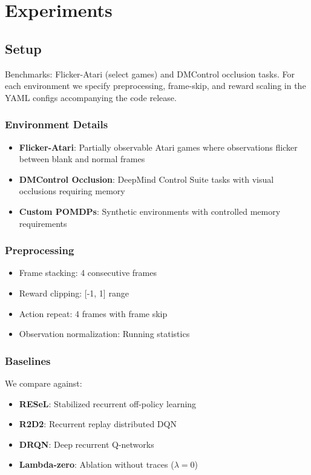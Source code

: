 \documentclass{article}
\begin{document}
\section{Experiments}
\subsection{Setup}
Benchmarks: Flicker-Atari (select games) and DMControl occlusion tasks. For each environment we specify preprocessing, frame-skip, and reward scaling in the YAML configs accompanying the code release.

\subsubsection{Environment Details}
\begin{itemize}
  \item \textbf{Flicker-Atari}: Partially observable Atari games where observations flicker between blank and normal frames
  \item \textbf{DMControl Occlusion}: DeepMind Control Suite tasks with visual occlusions requiring memory
  \item \textbf{Custom POMDPs}: Synthetic environments with controlled memory requirements
\end{itemize}

\subsubsection{Preprocessing}
\begin{itemize}
  \item Frame stacking: 4 consecutive frames
  \item Reward clipping: [-1, 1] range
  \item Action repeat: 4 frames with frame skip
  \item Observation normalization: Running statistics
\end{itemize}

\subsubsection{Baselines}
We compare against:
\begin{itemize}
  \item \textbf{RESeL}: Stabilized recurrent off-policy learning
  \item \textbf{R2D2}: Recurrent replay distributed DQN
  \item \textbf{DRQN}: Deep recurrent Q-networks
  \item \textbf{Lambda-zero}: Ablation without traces (\(\lambda=0\))
\end{itemize}
\end{document}
